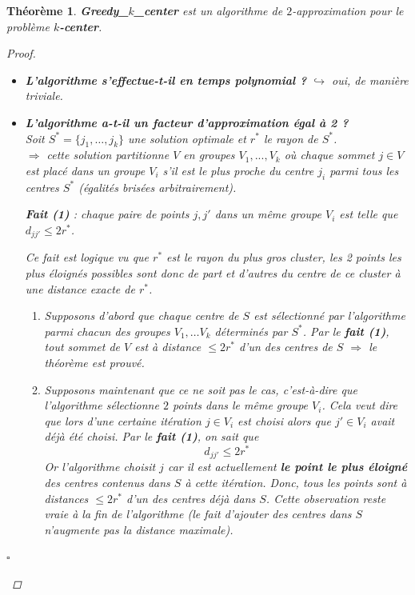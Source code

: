 \documentclass[12pt]{article}
\newcommand{\cqfd}{\begin{flushright}$\square$\end{flushright}}
\newtheorem{thm}{Th\'eor\`eme}[section]
\newtheorem{proof}{Preuve}[section]
\begin{document}
\begin{thm} \textbf{Greedy\_$k$\_center} est un algorithme de $2$-approximation
pour le problème \textbf{$k$-center}.
\begin{proof}$ $\\
\begin{itemize}
\item \textbf{L'algorithme s'effectue-t-il en temps polynomial ?}
$\hookrightarrow$ oui, de manière triviale.
\item \textbf{L'algorithme a-t-il un facteur d'approximation égal à 2 ?} \\
Soit $S^* = \{j_1,\ldots ,j_k\}$ une solution optimale et $r^*$ le rayon de
$S^*$.\\
$\Rightarrow$ cette solution partitionne $V$ en groupes $V_1,...,V_k$ où chaque
sommet $j\in V$ est placé dans un groupe $V_i$ s'il est le plus proche du centre
$j_i$ parmi tous les centres $S^*$ (égalités brisées arbitrairement). \\
\begin{center}
	\textbf{Fait (1)} : chaque paire de points $j,j'$ dans un même groupe $V_i$
    est telle que $d_{jj'} \leq 2r^*$.\\
\end{center}

Ce fait est logique vu que $r^*$ est le rayon du plus gros cluster, les 2 points
les plus éloignés possibles sont donc de part et d'autres  du centre de ce
cluster à une distance exacte de $r^*$.
\begin{enumerate}
\item Supposons d'abord que chaque centre de $S$ est sélectionné par
l'algorithme parmi chacun des groupes $V_1,\ldots V_k$ déterminés par $S^*$.
Par le \textbf{fait (1)}, tout sommet de $V$ est à distance $\leq 2r^*$ d'un des
centres de $S$ $\Rightarrow$ le théorème est prouvé.
\item Supposons maintenant que ce ne soit pas le cas, c'est-à-dire que
l'algorithme sélectionne $2$ points dans le même groupe $V_i$.
Cela veut dire que lors d'une certaine itération $j\in V_i$ est choisi alors
que $j'\in V_i$ avait déjà été choisi. Par le \textbf{fait (1)}, on sait que
$$d_{jj'} \leq 2r^*$$
Or l'algorithme choisit $j$ car il est actuellement \textbf{le point le plus
éloigné} des centres contenus dans $S$ à cette itération.
Donc, tous les points sont à distances $\leq 2r^*$ d'un des centres déjà dans
$S$. Cette observation reste vraie à la fin de l'algorithme (le fait d'ajouter
des centres dans $S$ n'augmente pas la distance maximale).
\end{enumerate}
\end{itemize}
\cqfd
\end{proof}
\end{thm}
\end{document}
